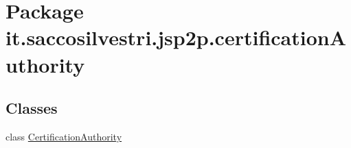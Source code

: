 \hypertarget{namespaceit_1_1saccosilvestri_1_1jsp2p_1_1certification_authority}{
\section{\-Package it.saccosilvestri.jsp2p.certification\-Authority}
\label{namespaceit_1_1saccosilvestri_1_1jsp2p_1_1certification_authority}
}
\subsection*{\-Classes}
\begin{DoxyCompactItemize}
\item 
class \hyperlink{classit_1_1saccosilvestri_1_1jsp2p_1_1certification_authority_1_1_certification_authority}{\-Certification\-Authority}
\end{DoxyCompactItemize}
